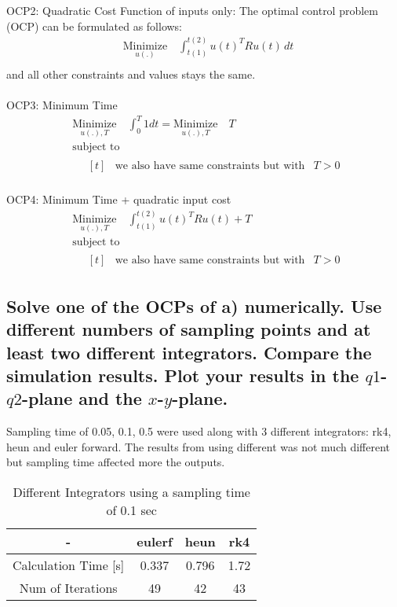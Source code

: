 \documentclass[a4paper, 12pt]{report}
\begin{document}
OCP2: Quadratic Cost Function of inputs only:
The optimal control problem (OCP) can be formulated as follows:
\begin{align*}
&\underset{u(.)}{\text{Minimize}} \quad \int_{t(1)}^{t(2)} u(t)^T R u(t) \, dt \\
\end{align*}
and all other constraints and values stays the same.\\
\\
OCP3: Minimum Time
\begin{align*}
&\underset{u(.), T}{\text{Minimize}} \quad \int_{0}^{T} 1 dt = \underset{u(.), T}{\text{Minimize}} \quad T\\
&\text{subject to} \\
&\quad 
\begin{aligned}[t] 
& \text{we also have same constraints but with} & T > 0
\end{aligned}
\end{align*}
\\
OCP4: Minimum Time + quadratic input cost
\begin{align*}
&\underset{u(.), T}{\text{Minimize}} \quad \int_{t(1)}^{t(2)} u(t)^T R u(t) + T\\
&\text{subject to} \\
&\quad 
\begin{aligned}[t] 
& \text{we also have same constraints but with} & T > 0
\end{aligned}
\end{align*}

\subsection{Solve one of the OCPs of a) numerically. Use different numbers of sampling points and at least two different integrators. Compare the simulation results. Plot your results in the $q1$-$q2$-plane and the $x$-$y$-plane.}
Sampling time of {0.05, 0.1, 0.5} were used along with 3 different integrators: rk4, heun and euler forward.
The results from using different was not much different but sampling time affected more the outputs.


\begin{table}[h]
    \centering
    \begin{tabular}{|c|c|c|c|}
        \hline
        - & eulerf & heun & rk4 \\
        \hline
        Calculation Time [s] &0.337 &0.796 &1.72 \\
        Num of Iterations &49 & 42&43 \\
        \hline
    \end{tabular}
    \caption{Different Integrators using a sampling time of 0.1 sec}
    \label{tab:my_label}
\end{table}
\end{document}
